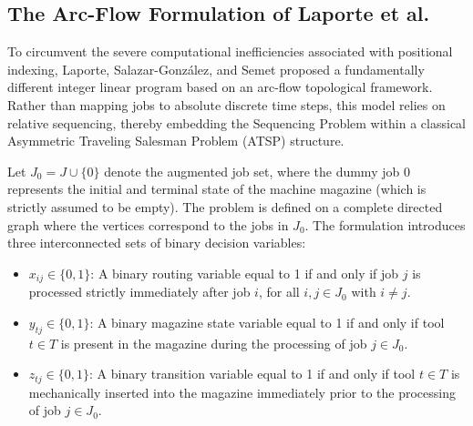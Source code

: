 \documentclass[11pt, a4paper]{book}
\begin{document}
	\subsection{The Arc-Flow Formulation of Laporte et al.}
	
	To circumvent the severe computational inefficiencies associated with positional indexing, Laporte, Salazar-Gonz{\'a}lez, and Semet \cite{Laporte2004} proposed a fundamentally different integer linear program based on an arc-flow topological framework. Rather than mapping jobs to absolute discrete time steps, this model relies on relative sequencing, thereby embedding the Sequencing Problem within a classical Asymmetric Traveling Salesman Problem (ATSP) structure.
	
	Let $J_0 = J \cup \{0\}$ denote the augmented job set, where the dummy job $0$ represents the initial and terminal state of the machine magazine (which is strictly assumed to be empty). The problem is defined on a complete directed graph where the vertices correspond to the jobs in $J_0$. The formulation introduces three interconnected sets of binary decision variables:
	
	\begin{itemize}
		\item $x_{ij} \in \{0,1\}$: A binary routing variable equal to 1 if and only if job $j$ is processed strictly immediately after job $i$, for all $i, j \in J_0$ with $i \neq j$.
		\item $y_{tj} \in \{0,1\}$: A binary magazine state variable equal to 1 if and only if tool $t \in T$ is present in the magazine during the processing of job $j \in J_0$.
		\item $z_{tj} \in \{0,1\}$: A binary transition variable equal to 1 if and only if tool $t \in T$ is mechanically inserted into the magazine immediately prior to the processing of job $j \in J_0$.
	\end{itemize}
	
\end{document}
